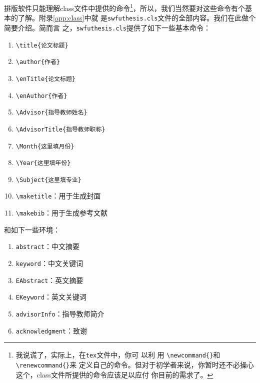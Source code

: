 排版软件只能理解class文件中提供的命令\footnote{我说谎了，实际上，在\texttt{tex}文件中，你可
  以利
  用 \texttt{\textbackslash{}newcommand\{\}}和 \texttt{\textbackslash{}renewcommand\{\}}来
  定义自己的命令。但对于初学者来说，你暂时还不必操心这个，class文件所提供的命令应该足以应付
  你目前的需求了。}，所以，我们当然要对这些命令有个基本的了解。附录\ref{app:class}中就
是\texttt{swfuthesis.cls}文件的全部内容。我们在此做个简要介绍。简而言
之，\texttt{swfuthesis.cls}提供了如下一些基本命令：
\begin{singlespace}
  \begin{multicols}{2}
    \begin{enumerate}
    \item \verb'\title{论文标题}'
    \item \verb'\author{作者}'
    \item \verb'\enTitle{论文标题}'
    \item \verb'\enAuthor{作者}'
    \item \verb'\Advisor{指导教师姓名}'
    \item \verb'\AdvisorTitle{指导教师职称}'
    \item \verb'\Month{这里填月份}'
    \item \verb'\Year{这里填年份}'
    \item \verb'\Subject{这里填专业}'
    \item \verb'\maketitle'：用于生成封面
    \item \verb'\makebib'：用于生成参考文献
    \end{enumerate}
  \end{multicols}
\end{singlespace}
和如下一些环境：
\begin{singlespace}
  \begin{multicols}{2}
    \begin{enumerate}
    \item \verb'abstract'：中文摘要
    \item \verb'keyword'：中文关键词
    \item \verb'EAbstract'：英文摘要
    \item \verb'EKeyword'：英文关键词
    \item \verb'advisorInfo'：指导教师简介
    \item \verb'acknowledgment'：致谢
    \end{enumerate}
  \end{multicols}
\end{singlespace}

